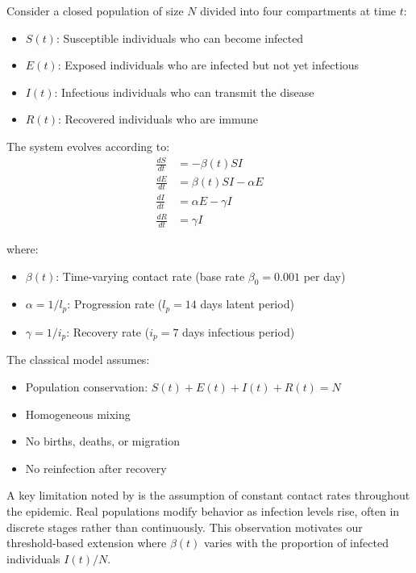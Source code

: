 \documentclass{article} %
\begin{document}
Consider a closed population of size $N$ divided into four compartments at time $t$:
\begin{itemize}
    \item $S(t)$: Susceptible individuals who can become infected
    \item $E(t)$: Exposed individuals who are infected but not yet infectious
    \item $I(t)$: Infectious individuals who can transmit the disease
    \item $R(t)$: Recovered individuals who are immune
\end{itemize}

The system evolves according to:
\begin{align}
    \frac{dS}{dt} &= -\beta(t)SI \label{eq:seir_s} \\
    \frac{dE}{dt} &= \beta(t)SI - \alpha E \label{eq:seir_e} \\
    \frac{dI}{dt} &= \alpha E - \gamma I \label{eq:seir_i} \\
    \frac{dR}{dt} &= \gamma I \label{eq:seir_r}
\end{align}

where:
\begin{itemize}
    \item $\beta(t)$: Time-varying contact rate (base rate $\beta_0 = 0.001$ per day)
    \item $\alpha = 1/l_p$: Progression rate ($l_p = 14$ days latent period)
    \item $\gamma = 1/i_p$: Recovery rate ($i_p = 7$ days infectious period)
\end{itemize}

The classical model assumes:
\begin{itemize}
    \item Population conservation: $S(t) + E(t) + I(t) + R(t) = N$
    \item Homogeneous mixing
    \item No births, deaths, or migration
    \item No reinfection after recovery
\end{itemize}

A key limitation noted by \citet{he2020seir} is the assumption of constant contact rates throughout the epidemic. Real populations modify behavior as infection levels rise, often in discrete stages rather than continuously. This observation motivates our threshold-based extension where $\beta(t)$ varies with the proportion of infected individuals $I(t)/N$.
\end{document}
